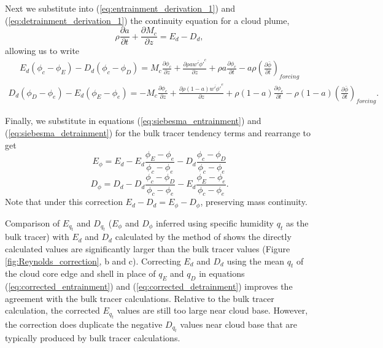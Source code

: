 \documentclass[12pt]{article}
\begin{document}
Next we substitute into (\ref{eq:entrainment_derivation_1}) and
(\ref{eq:detrainment_derivation_1}) the continuity equation for a cloud plume,
\begin{equation}
   \label{eq:continuity}
   \rho \frac{\partial a}{\partial t} 
   + \frac{\partial M_c}{\partial z} = E_d - D_d,
\end{equation}
allowing us to write
\begin{eqnarray}
  \label{eq:entrainment_derivation_2}
    E_d (\phi_c - \phi_E) - D_d (\phi_c - \phi_D)
    = M_c \frac{\partial \phi_c}{\partial z}
    + \frac{\partial \rho a \overline{w' \phi'}^c}{\partial z} 
    + \rho a \frac{\partial \phi_c}{\partial t}
    - a \rho \left(\frac{\partial \bar{\phi}}{\partial t}\right)_{forcing}
\end{eqnarray}
\begin{eqnarray}
  \label{eq:detrainment_derivation_2}
    D_d (\phi_D - \phi_e) - E_d (\phi_E - \phi_e)
    = - M_c \frac{\partial \phi_e}{\partial z}
    + \frac{\partial \rho (1 - a) \overline{w' \phi'}^e}{\partial z} 
    + \rho (1 - a) \frac{\partial \phi_e}{\partial t}
    - \rho (1 - a) \left(\frac{\partial \bar{\phi}}{\partial t}\right)_{forcing}.
\end{eqnarray}

Finally, we substitute in equations (\ref{eq:siebesma_entrainment}) and 
(\ref{eq:siebesma_detrainment}) for the bulk tracer tendency terms and 
rearrange to get
\begin{equation}
  \label{eq:corrected_entrainment}
    E_{\phi} = E_d - E_d\frac{\phi_E - \phi_e}{\phi_{c} - \phi_{e}}
             - D_d\frac{\phi_c - \phi_D}{\phi_{c} - \phi_{e}}
\end{equation}
\begin{equation}
  \label{eq:corrected_detrainment}
    D_{\phi} = D_d - D_d\frac{\phi_c - \phi_D}{\phi_{c} - \phi_{e}}
             - E_d\frac{\phi_E - \phi_e}{\phi_{c} - \phi_{e}}.
\end{equation}
Note that under this correction $E_d-D_d = E_{\phi}-D_{\phi}$, preserving 
mass continuity.

Comparison of $E_{q_t}$ and $D_{q_t}$ ($E_{\phi}$ and $D_{\phi}$ inferred using 
specific humidity $q_t$ as the bulk tracer) with $E_d$ and $D_d$ calculated by 
the method of \cite{Romps2010} shows the directly calculated values are 
significantly larger than the bulk tracer values (Figure 
\ref{fig:Reynolds_correction}, b and c).  Correcting $E_d$ and $D_d$ using the 
mean $q_t$ of the cloud core edge and shell in place of $q_E$ and $q_D$ in 
equations (\ref{eq:corrected_entrainment}) and (\ref{eq:corrected_detrainment})
improves the agreement with the bulk tracer calculations.  Relative to the bulk 
tracer calculation, the corrected $E_{q_t}$ values are still too large near 
cloud base.  However, the correction does duplicate the negative $D_{q_t}$ 
values near cloud base that are typically produced by bulk tracer calculations.
\end{document}
